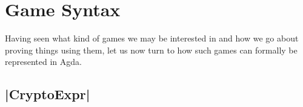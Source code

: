 \chapter{Game Syntax}

Having seen what kind of games we may be interested in and how we go about proving things using them, let us now turn to
how such games can formally be represented in Agda.

\section{|CryptoExpr|}




